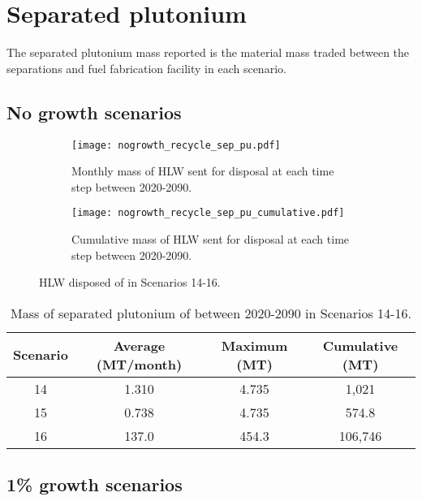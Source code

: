 \section{Separated plutonium}
The separated plutonium mass reported is the material mass traded 
between the separations and fuel fabrication facility in each 
scenario. 

\subsection{No growth scenarios}
\begin{figure}[h!]
    \centering
    \begin{subfigure}[b]{0.49\textwidth}
        \centering
        \texttt{[image: nogrowth\_recycle\_sep\_pu.pdf]}
        \caption{Monthly mass of HLW sent for disposal 
        at each time step between 2020-2090.}
        \label{fig:nogrowth_recycle_sep_pu_all}
    \end{subfigure}
    \hfill
    \begin{subfigure}[b]{0.49\textwidth}
        \centering
        \texttt{[image: nogrowth\_recycle\_sep\_pu\_cumulative.pdf]}
        \caption{Cumulative mass of HLW sent for disposal 
        at each time step between 2020-2090.}
        \label{fig:nogrowth_recycle_sep_pu_cumulative}
    \end{subfigure}
       \caption{\gls{HLW} disposed of in Scenarios 14-16.}
       \label{fig:nogrowth_recycle_sep_pu}
\end{figure}

\begin{table}[h!]
    \centering 
    \caption{Mass of separated plutonium of between 2020-2090 in 
    Scenarios 14-16.}
    \label{tab:sep_pu_14-16}
    \begin{tabular}{c c c c}
        \hline 
        Scenario & Average (MT/month) & Maximum (MT) & Cumulative (MT) \\
        \hline
        14 & 1.310 & 4.735 & 1,021\\
        15 & 0.738 & 4.735 & 574.8\\
        16 & 137.0 & 454.3 & 106,746\\
        \hline
    \end{tabular}
\end{table}

\subsection{1\% growth scenarios}

